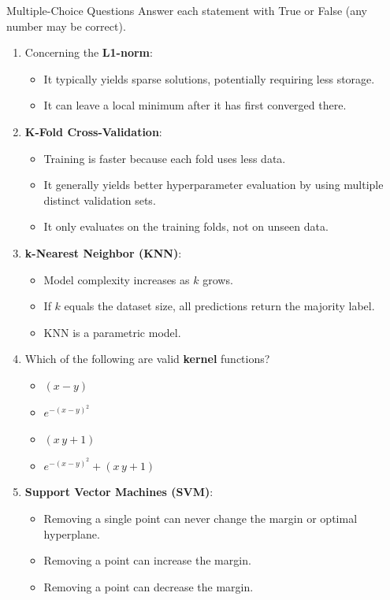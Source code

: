 \documentclass{article}
\begin{document}

\begin{exercise}{Multiple-Choice Questions}
  Answer each statement with True or False (any number may be correct).

  \begin{enumerate}
    \item Concerning the \textbf{L1-norm}:
      \begin{itemize}
        \item It typically yields sparse solutions, potentially requiring less storage.
        \item It can leave a local minimum after it has first converged there.
      \end{itemize}

    \item \textbf{K-Fold Cross-Validation}:
      \begin{itemize}
        \item Training is faster because each fold uses less data.
        \item It generally yields better hyperparameter evaluation by using multiple distinct validation sets.
        \item It only evaluates on the training folds, not on unseen data.
      \end{itemize}

    \item \textbf{k-Nearest Neighbor (KNN)}:
      \begin{itemize}
        \item Model complexity increases as $k$ grows.
        \item If $k$ equals the dataset size, all predictions return the majority label.
        \item KNN is a parametric model.
      \end{itemize}

    \item Which of the following are valid \textbf{kernel} functions?
      \begin{itemize}
        \item $(x - y)$
        \item $e^{-(x - y)^2}$
        \item $(x\,y + 1)$
        \item $e^{-(x - y)^2} + (x\,y + 1)$
      \end{itemize}

    \item \textbf{Support Vector Machines (SVM)}:
      \begin{itemize}
        \item Removing a single point can never change the margin or optimal hyperplane.
        \item Removing a point can increase the margin.
        \item Removing a point can decrease the margin.
      \end{itemize}


\end{enumerate}
\end{exercise}
\end{document}
